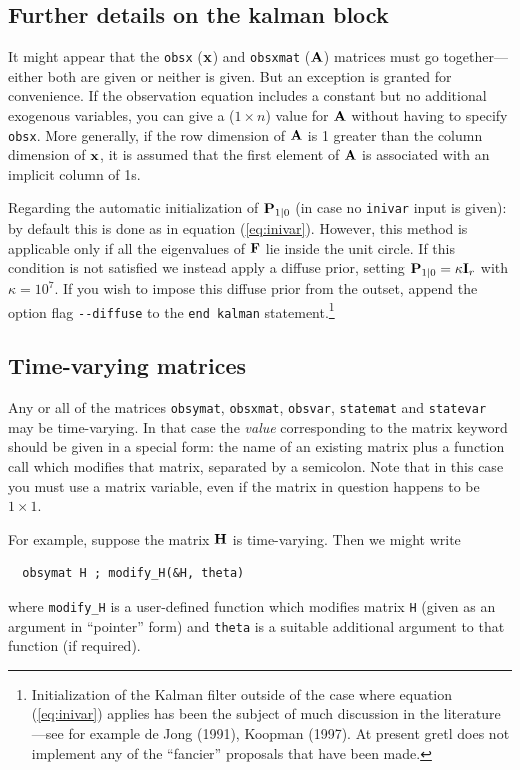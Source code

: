\documentclass[a4paper]{article}
\newcommand{\obsmat}{\ensuremath\mathbf{H}}
\newcommand{\obsx}{\ensuremath\mathbf{x}}
\newcommand{\obsxmat}{\ensuremath\mathbf{A}}
\newcommand{\statemat}{\ensuremath\mathbf{F}}
\newcommand{\statevar}{\ensuremath\mathbf{P}}
\begin{document}
\subsection{Further details on the kalman block}

It might appear that the \texttt{obsx} ($\obsx$) and \texttt{obsxmat}
($\obsxmat$) matrices must go together---either both are given or
neither is given.  But an exception is granted for convenience.  If
the observation equation includes a constant but no additional
exogenous variables, you can give a ($1 \times n$) value for
$\obsxmat$ without having to specify \texttt{obsx}.  More generally,
if the row dimension of $\obsxmat$ is 1 greater than the column
dimension of $\obsx$, it is assumed that the first element of
$\obsxmat$ is associated with an implicit column of 1s.

Regarding the automatic initialization of $\statevar_{1|0}$ (in case
no \texttt{inivar} input is given): by default this is done as in
equation (\ref{eq:inivar}).  However, this method is applicable only
if all the eigenvalues of $\statemat$ lie inside the unit circle.  If
this condition is not satisfied we instead apply a diffuse prior,
setting $\statevar_{1|0} = \kappa \mathbf{I}_r$ with $\kappa = 10^7$.
If you wish to impose this diffuse prior from the outset, append the
option flag \verb|--diffuse| to the \texttt{end kalman}
statement.\footnote{ Initialization of the Kalman filter outside of
  the case where equation (\ref{eq:inivar}) applies has been the
  subject of much discussion in the literature---see for example de
  Jong (1991), Koopman (1997).  At present gretl does not implement
  any of the ``fancier'' proposals that have been made.}

\subsection{Time-varying matrices}

Any or all of the matrices \texttt{obsymat}, \texttt{obsxmat},
\texttt{obsvar}, \texttt{statemat} and \texttt{statevar} may be
time-varying.  In that case the \textsl{value} corresponding to the
matrix keyword should be given in a special form: the name of an
existing matrix plus a function call which modifies that matrix,
separated by a semicolon.  Note that in this case you must use
a matrix variable, even if the matrix in question happens to be
$1 \times 1$. 

For example, suppose the matrix $\obsmat$ is time-varying.  Then we
might write
%
\begin{verbatim}
  obsymat H ; modify_H(&H, theta)
\end{verbatim}
%
where \texttt{modify\_H} is a user-defined function which modifies
matrix \texttt{H} (given as an argument in ``pointer'' form) and
\texttt{theta} is a suitable additional argument to that function (if
required).
\end{document}
